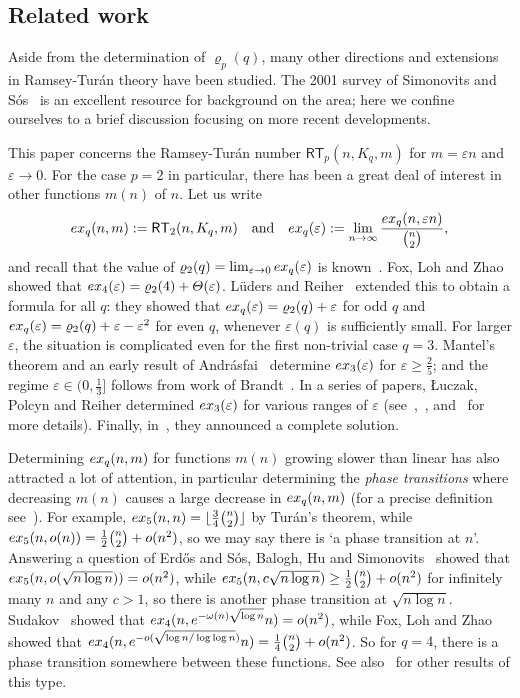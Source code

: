 \documentclass[11pt, a4paper]{article}
\theoremstyle{definition}
\def\eps{{\varepsilon}}
\newcommand{\rt}{{\mathsf{RT}}}
\begin{document}
\subsection{Related work}

Aside from the determination of $\varrho_p(q)$, many other directions and extensions in Ramsey-Tur\'an theory have been studied. The 2001 survey of Simonovits and S\'os~\cite{SimSos} is an excellent resource for background on the area; here we confine ourselves to a brief discussion focusing on more recent developments.

This paper concerns the Ramsey-Tur\'an number $\rt_p(n,K_q,m)$ for $m=\eps n$ and $\eps \to 0$. 
For the case $p=2$ in particular, there has been a great deal of interest in other functions $m(n)$ of $n$.
Let us write
$$
{\rm ex}_q(n,m) := \rt_2(n,K_q,m)\quad\text{and}\quad {\rm ex}_q(\eps) := \lim_{n\to\infty}\frac{{\rm ex}_q(n,\eps n)}{\binom{n}{2}},
$$
and recall that the value of
$\varrho_2(q) = \lim_{\eps\to 0}{\rm ex}_q(\eps)$ is known~\cite{EHSSz,ES}.
Fox, Loh and Zhao~\cite{FLZh} showed that ${\rm ex}_4(\eps) = \varrho_2(4)+\Theta(\eps)$.
L\"uders and Reiher~\cite{LuedersReiher} extended this to obtain a formula for all $q$: they showed that ${\rm ex}_q(\eps) = \varrho_2(q)+\eps$ for odd $q$ and ${\rm ex}_q(\eps) = \varrho_2(q)+\eps-\eps^2$ for even $q$, whenever $\eps(q)$ is sufficiently small. For larger $\eps$, the situation is complicated even for the first non-trivial case $q=3$.
Mantel's theorem and an early result of Andr\'asfai~\cite{Andrasfai} determine ${\rm ex}_3(\eps)$ for $\eps \geq \frac{2}{5}$; and the regime $\eps\in(0,\frac{1}{3}]$ follows from work of Brandt~\cite{Brandt}. In a series of papers, {\L}uczak, Polcyn and Reiher determined ${\rm ex}_3(\eps)$ for various ranges of $\eps$ (see~\cite{LPR1},~\cite{LPR2}, and~\cite{LPR3} for more details). Finally, in~\cite{LPR3}, they announced a complete solution.

Determining ${\rm ex}_q(n,m)$ for functions $m(n)$ growing slower than linear has also attracted a lot of attention,
in particular determining the \emph{phase transitions} where decreasing $m(n)$ causes a large decrease in ${\rm ex}_q(n,m)$ (for a precise definition see~\cite{BHS}).
For example, ${\rm ex}_5(n,n) = \lfloor\frac{3}{4}\binom{n}{2}\rfloor$ by Tur\'an's theorem, while ${\rm ex}_5(n,o(n))=\frac{1}{2}\binom{n}{2}+o(n^2)$, so we may say there is `a phase transition at $n$'. Answering a question of Erd\H{o}s and S\'os,
Balogh, Hu and Simonovits~\cite{BHS} showed that ${\rm ex}_5(n,o(\sqrt{n\log n})) = o(n^2)$, while ${\rm ex}_5(n,c\sqrt{n\log n}) \geq \frac{1}{2}\binom{n}{2}+o(n^2)$ for infinitely many $n$ and any $c > 1$, so there is another phase transition at $\sqrt{n\log n}$.
Sudakov~\cite{Sudakov} showed that ${\rm ex}_{4}(n,e^{-\omega(n)\sqrt{\log n}}n) = o(n^2)$, while Fox, Loh and Zhao~\cite{FLZh} showed that ${\rm ex}_4(n,e^{-o(\sqrt{\log n/ \log \log n})}n) = \frac{1}{4}\binom{n}{2}+o(n^2)$. So for $q=4$, there is a phase transition somewhere between these functions.
See also~\cite{BD,KKL} for other results of this type.
\end{document}
